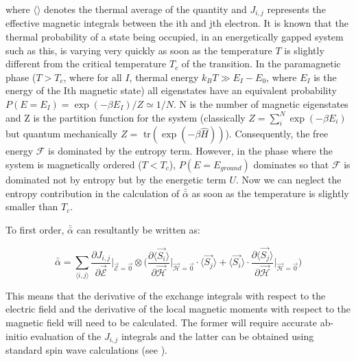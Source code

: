 \documentclass[10pt]{article}
\begin{document}
where $\langle \rangle$ denotes the thermal average of the quantity and $J_{i,j}$ represents the effective magnetic integrals between the ith and jth electron. It is known that the thermal probability of a state being occupied, in an energetically gapped system such as this, is varying very quickly as soon as the temperature $T$ is slightly different from the critical temperature $T_c$ of the transition. In the paramagnetic phase ($T > T_c$, where for all $I$, thermal energy $k_B T \gg E_I - E_0$, where $E_I$ is the energy of the Ith magnetic state) all eigenstates have an equivalent probability $P(E = E_I) = \exp(-\beta E_I)/Z \simeq 1/N$. N is the number of magnetic eigenstates and Z is the partition function for the system (classically $Z = \sum_{i}^{N} \exp(-\beta E_i)$ but quantum mechanically $Z =$ tr$(\exp(-\beta \hat{H}))$). Consequently, the free energy $\mathcal{F}$ is dominated by the entropy term. However, in the phase where the system is magnetically ordered ($T < T_c$), $P(E = E_{ground})$ dominates so that $\mathcal{F}$ is dominated not by entropy but by the energetic term $U$. Now we can neglect the entropy contribution in the calculation of $\bar{\bar{\alpha}}$ as soon as the temperature is slightly smaller than $T_c$.

To first order, $\bar{\bar{\alpha}}$ can resultantly be written as:

\begin{equation*}
	\bar{\bar{\alpha}} = \sum_{\langle i,j \rangle} \frac{\partial J_{i,j}}{\partial \vec{\mathcal{E}}}\biggr\vert_{\vec{\mathcal{E}}=\vec{0}}\otimes\biggr(\frac{\partial \langle \vec{S_i}\rangle}{\partial \vec{\mathcal{H}}}\biggr\vert_{\vec{\mathcal{H}} = \vec{0}}\cdot\langle\vec{S_j}\rangle + \langle\vec{S_i}\rangle\cdot\frac{\partial \langle \vec{S_j}\rangle}{\partial\vec{\mathcal{H}}}\biggr\vert_{\vec{\mathcal{H}}=\vec{0}}\biggr)
\end{equation*}

This means that the derivative of the exchange integrals with respect to the electric field and the derivative of the local magnetic moments with respect to the magnetic field will need to be calculated. The former will require accurate ab-initio evaluation of the $J_{i,j}$ integrals and the latter can be obtained using standard spin wave calculations (see \cite{anderson1951limits,kubo1952spin,oguchi1960theory}).

\end{document}
